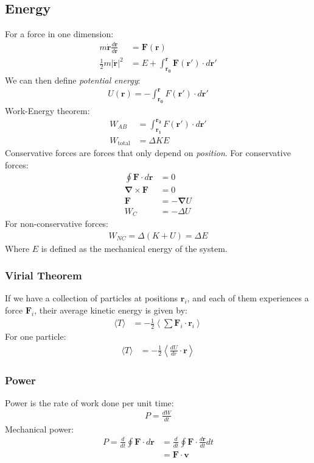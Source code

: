\documentclass[11pt, letterpaper]{article}
\newcommand{\ve}[1]{
  \ensuremath{\bm{#1}}}	               %
\begin{document}
\begin{multicols*}{3}
\subsection{Energy}
For a force in one dimension:
\begin{align*}
  m \dot{\ve{r}} \frac{d\dot{\ve{r}}}{d\ve{r}} &= \ve{F}(\ve{r}) \\
  \frac{1}{2}m |\dot{\ve{r}}|^2 &= E + \int_{\ve{r_0}}^{\ve{r}} \ve{F}(\ve{r}')
  \cdot d\ve{r}'
\end{align*}
We can then define \emph{potential energy}:
\begin{align*}
  U(\ve{r}) = - \int_{\ve{r_0}}^{\ve{r}} F(\ve{r}') \cdot d\ve{r}'
\end{align*}
Work-Energy theorem:
\begin{align*}
  W_{AB} &= \int_{\ve{r_1}}^{\ve{r_2}} F(\ve{r}') \cdot d\ve{r}' \\
  W_{\text{total}} &= \Delta KE
\end{align*}
Conservative forces are forces that only depend on {\em position}. For
conservative forces:
\begin{align*}
  \oint \ve{F} \cdot d\ve{r} &= 0 \\
  \ve{\nabla} \times \ve{F} &= 0 \\
  \ve{F} &= - \ve{\nabla} U \\
  W_{C} &= -\Delta U
\end{align*}
For non-conservative forces:
\begin{align*}
  W_{NC} = \Delta(K+U) = \Delta E
\end{align*}
Where $E$ is defined as the mechanical energy of the system.
\subsubsection{Virial Theorem}
If we have a collection of particles at positions $\ve{r}_i$, and each of them
experiences a force $\ve{F}_i$, their average kinetic energy is given by:
\begin{align*}
  \langle T \rangle &= -\frac{1}{2} \left\langle \sum \ve{F}_i \cdot \ve{r}_i
  \right\rangle
\end{align*}
For one particle:
\begin{align*}
  \langle T \rangle &= -\frac{1}{2} \left\langle \frac{dU}{dr} \cdot \ve{r}
  \right\rangle
\end{align*}
\subsubsection{Power}
Power is the rate of work done per unit time:
\begin{align*}
  P=\frac{dW}{dt}
\end{align*}
Mechanical power:
\begin{align*}
  P=\frac{d}{dt}\oint \ve{F} \cdot d\ve{r}&=\frac{d}{dt}\oint \ve{F} \cdot \frac{d\ve{r}}{dt} dt\\
  &=\ve{F} \cdot \ve{v}
\end{align*}

\end{multicols*}
\end{document}
